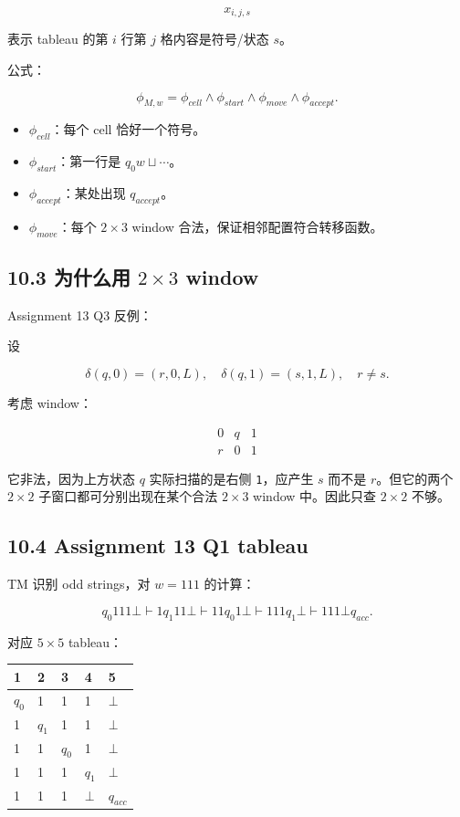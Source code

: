 ﻿\documentclass[UTF8,11pt]{ctexart}
\begin{document}
\[
x_{i,j,s}
\]

表示 tableau 的第 \(i\) 行第 \(j\) 格内容是符号/状态 \(s\)。


公式：

\[
\phi_{M,w}=\phi_{cell}\wedge\phi_{start}\wedge\phi_{move}\wedge\phi_{accept}.
\]


\begin{itemize}
\item \(\phi_{cell}\)：每个 cell 恰好一个符号。
\item \(\phi_{start}\)：第一行是 \(q_0w\sqcup\cdots\)。
\item \(\phi_{accept}\)：某处出现 \(q_{accept}\)。
\item \(\phi_{move}\)：每个 \(2\times3\) window 合法，保证相邻配置符合转移函数。
\end{itemize}


\subsection{10.3 为什么用 \(2\times3\) window}


Assignment 13 Q3 反例：


设

\[
\delta(q,0)=(r,0,L),\quad \delta(q,1)=(s,1,L),\quad r\ne s.
\]

考虑 window：

\[
\begin{array}{ccc}
0&q&1\\
r&0&1
\end{array}
\]

它非法，因为上方状态 \(q\) 实际扫描的是右侧 \texttt{1}，应产生 \(s\) 而不是 \(r\)。但它的两个 \(2\times2\) 子窗口都可分别出现在某个合法 \(2\times3\) window 中。因此只查 \(2\times2\) 不够。


\subsection{10.4 Assignment 13 Q1 tableau}


TM 识别 odd strings，对 \(w=111\) 的计算：

\[
q_0 111\bot \vdash 1q_1 11\bot \vdash 11q_0 1\bot
\vdash 111q_1\bot \vdash 111\bot q_{acc}.
\]

对应 \(5\times5\) tableau：


\begin{longtable}{|p{}|p{}|p{}|p{}|p{}|}
\hline
\textbf{1} & \textbf{2} & \textbf{3} & \textbf{4} & \textbf{5} \\
\hline
\(q_0\) & 1 & 1 & 1 & \(\bot\) \\
\hline
1 & \(q_1\) & 1 & 1 & \(\bot\) \\
\hline
1 & 1 & \(q_0\) & 1 & \(\bot\) \\
\hline
1 & 1 & 1 & \(q_1\) & \(\bot\) \\
\hline
1 & 1 & 1 & \(\bot\) & \(q_{acc}\) \\
\hline
\end{longtable}
\end{document}
